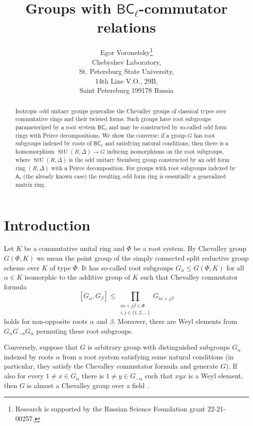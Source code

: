 \documentclass{article}
\title{
    Groups with \(\mathsf{BC}_\ell\)-commutator relations
}
\author{
      Egor Voronetsky\thanks{
          Research is supported by the Russian Science Foundation grant 22-21-00257.
      } \\
      Chebyshev Laboratory, \\
      St. Petersburg State University, \\
      14th Line V.O., 29B, \\
      Saint Petersburg 199178 Russia \\
}
\theoremstyle{definition}
\DeclareMathOperator\stunit{StU}
\begin{document}
\maketitle

\begin{abstract}
Isotropic odd unitary groups generalize the Chevalley groups of classical types over commutative rings and their twisted forms. Such groups have root subgroups parameterized by a root system \(\mathsf{BC}_\ell\) and may be constructed by so-called odd form rings with Peirce decompositions. We show the converse: if a group \(G\) has root subgroups indexed by roots of \(\mathsf{BC}_\ell\) and satisfying natural conditions, then there is a homomorphism \(
    \stunit(R, \Delta) \to G
\) inducing isomorphisms on the root subgroups, where \(\stunit(R, \Delta)\) is the odd unitary Steinberg group constructed by an odd form ring \((R, \Delta)\) with a Peirce decomposition. For groups with root subgroups indexed by \(\mathsf A_\ell\) (the already known case) the resulting odd form ring is essentially a generalized matrix ring.
\end{abstract}




\section{Introduction}

Let \(K\) be a commutative unital ring and \(\Phi\) be a root system. By Chevalley group \(G(\Phi, K)\) we mean the point group of the simply connected split reductive group scheme over \(K\) of type \(\Phi\). It has so-called root subgroups \(
    G_\alpha \leq G(\Phi, K)
\) for all \(\alpha \in K\) isomorphic to the additive group of \(K\) such that Chevalley commutator formula \[
    [G_\alpha, G_\beta]
    \leq
    \prod_{\substack{
        i \alpha + j \beta \in \Phi \\
        i, j \in \{1, 2, \ldots\}
    }} G_{i \alpha + j \beta}
\]
holds for non-opposite roots \(\alpha\) and \(\beta\). Moreover, there are Weyl elements from \(
    G_\alpha G_{-\alpha} G_\alpha
\) permuting these root subgroups.

Conversely, suppose that \(G\) is arbitrary group with distinguished subgroups \(G_\alpha\) indexed by roots \(\alpha\) from a root system satisfying some natural conditions (in particular, they satisfy the Chevalley commutator formula and generate \(G\)). If also for every \(
    1 \neq x \in G_\alpha
\) there is \(
    1 \neq y \in G_{-\alpha}
\) such that \(xyx\) is a Weyl element, then \(G\) is almost a Chevalley group over a field \cite{root-group-datum, abs-root-subgr}.
\end{document}
